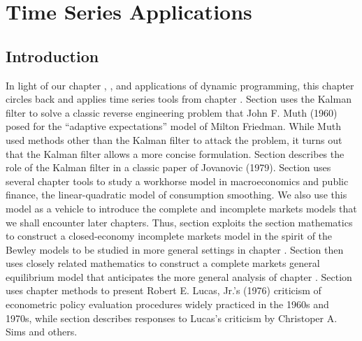 %
%


\chapter{Time Series Applications\label{timeseriesapp}}
\def\toone{{t+1}}
\def\ttwo{{t+2}}
\def\tthree{{t+3}}
\def\Tone{{T+1}}
\def\TTT{{T-1}}
\def\rtr{{\rm tr}}
\def\epigraph#1#2{%
\begingroup
\smallskip
\leftskip=2em
\rightskip=0pt plus2em
\it\noindent #1\par
\noindent --- #2\par
\endgroup\noindent}
%
\def\frac#1#2{#1\over #2}
%


\section{Introduction}

In light of our chapter , , and  applications of  dynamic programming, this 
 chapter circles back and applies time series  tools from chapter .
  Section   %
  uses the
Kalman filter to solve a  classic reverse engineering problem that John F. Muth (1960)  posed for the ``adaptive expectations''  model of
Milton Friedman. While  Muth used   methods other than the Kalman filter  to attack the problem, it turns out that the Kalman
filter allows a more concise formulation. Section  %
 describes the  role of the Kalman filter  in
a classic paper of Jovanovic (1979). Section  uses several chapter   tools to
study   a workhorse  model in macroeconomics
and public finance, the linear-quadratic model of consumption smoothing.  We also use this  model as a vehicle  to introduce the complete and incomplete markets models that we shall
encounter  later chapters. Thus, section  exploits the section  mathematics to construct a closed-economy 
incomplete markets model in the spirit of the Bewley models to be studied in more general settings in chapter .  
Section  then uses closely related mathematics to construct a complete markets general equilibrium model that anticipates 
the more general analysis of chapter .
 Section  uses  chapter  methods to present Robert E. Lucas, Jr.'s (1976)
criticism of  econometric policy evaluation procedures widely practiced in the 1960s and 1970s, while section  describes   responses
to  Lucas's criticism by Christoper A. Sims and others.
%
%
%
%
%


